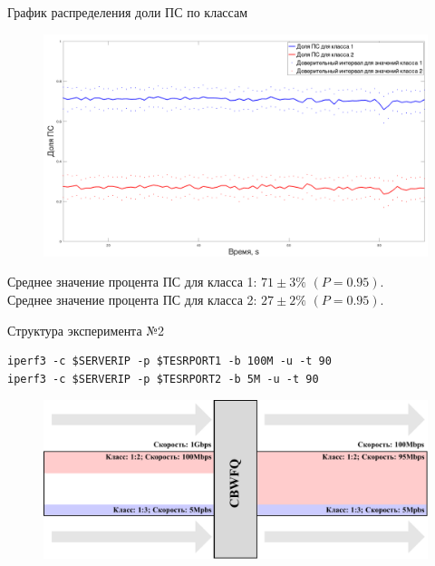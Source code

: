 \documentclass[12pt]{beamer}
\begin{document}
\begin{frame}{График распределения доли ПС по классам}
	\begin{figure}[t]
		\center
    	\includegraphics[scale=0.255]{./plotc.png}

	\end{figure}
	\begin{center}{\footnotesize
	 Среднее значение процента ПС для класса 1: $71 \pm 3 \%$ $(P = 0.95)$.\\
     Среднее значение процента ПС для класса 2: $27 \pm 2 \%$ $(P = 0.95)$.\\
	}
	\end{center}
\end{frame}

\begin{frame}[fragile]{Структура эксперимента №2}

{\footnotesize%
	\begin{lstlisting}[frame=single,emph={iperf3},emphstyle={\bfseries}]
iperf3 -c $SERVERIP -p $TESRPORT1 -b 100M -u -t 90
iperf3 -c $SERVERIP -p $TESRPORT2 -b 5M -u -t 90
    \end{lstlisting}%
}%

	\begin{figure}
		\center
    	\includegraphics[scale=0.65]{../text/pdfimages/exp_scheme2.pdf}
	\end{figure}
\end{frame}
\end{document}
